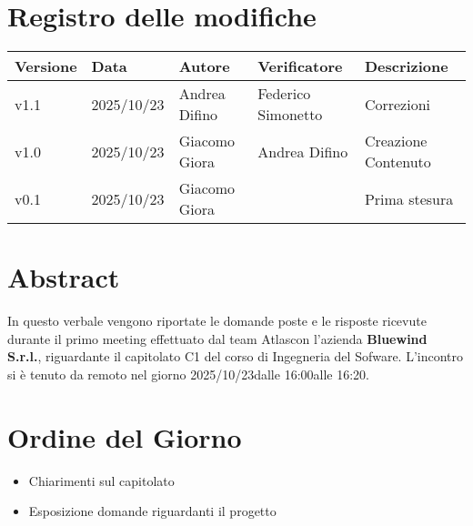 \documentclass[a4paper,12pt]{article}
\newcommand{\Gruppo}{Atlas}
\newcommand{\DataVerbale}{2025/10/23}
\newcommand{\OraInizio}{16:00}
\newcommand{\OraFine}{16:20}
\newcommand{\AbstractVerbale}{%
In questo verbale vengono riportate le domande poste e le risposte ricevute durante il primo meeting effettuato dal team \Gruppo \space con l'azienda \textbf{Bluewind S.r.l.}, riguardante il capitolato C1 del corso di Ingegneria del Sofware. L'incontro si è tenuto da remoto nel giorno \DataVerbale \space dalle \OraInizio \space alle \OraFine.
}
\newcommand{\VersioneVerbale}{v1.1} %
\begin{document}
\section*{Registro delle modifiche}{
    \begin{center} 
        \begin{tabular}{|l|l|l|l|l|}
            \hline
            \textbf{Versione} & \textbf{Data} & \textbf{Autore} & \textbf{Verificatore} & \textbf{Descrizione} \\
            \hline
            \VersioneVerbale & 2025/10/23 & Andrea Difino & Federico Simonetto & Correzioni\\ 
            \hline
            v1.0 & 2025/10/23 & Giacomo Giora & Andrea Difino & Creazione Contenuto\\ 
            \hline
            v0.1 & 2025/10/23 & Giacomo Giora &  & Prima stesura\\ 
            \hline
       \end{tabular}
    \end{center}
}

\newpage

\tableofcontents

\newpage
\section{Abstract}{
    \begin{minipage}{0.9\textwidth}
        \small
        \AbstractVerbale
    \end{minipage}
}


\section{Ordine del Giorno}{
    \begin{itemize}
        \item Chiarimenti sul capitolato
        \item Esposizione domande riguardanti il progetto
    \end{itemize}
}
\end{document}
